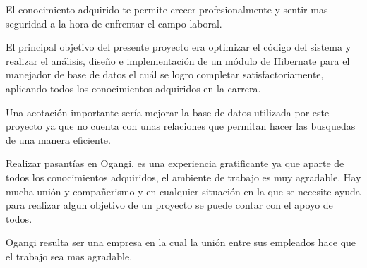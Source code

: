 \documentclass[spanish]{article}
\begin{document}
El conocimiento adquirido te permite crecer profesionalmente y sentir mas seguridad a la hora de enfrentar el campo laboral. 

El principal objetivo del presente proyecto era optimizar el código del sistema y realizar el análisis, diseño e implementación de un módulo de Hibernate para el manejador de base de datos el cuál se logro completar satisfactoriamente, aplicando todos los conocimientos adquiridos en la carrera.

Una acotación importante sería mejorar la base de datos utilizada por este proyecto ya que no cuenta con unas relaciones que permitan hacer las busquedas de una manera eficiente.

Realizar pasantías en Ogangi, es una experiencia gratificante ya que aparte de todos los conocimientos adquiridos, el ambiente de trabajo es muy agradable. Hay mucha unión y compañerismo y en cualquier situación en la que se necesite ayuda para realizar algun objetivo de un proyecto se puede contar con el apoyo de todos.  

Ogangi resulta ser una empresa en la cual la unión entre sus empleados hace que el trabajo sea mas agradable.





 

	
\end{document}
